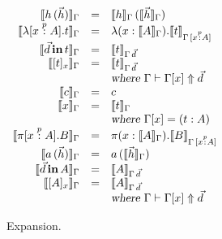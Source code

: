\begin{figure}
\begin{center}
\begin{math}
\begin{array}{rclr}

\llbracket h\,(\vec{h}) \rrbracket_{\Gamma}
&=& 
\llbracket h \rrbracket_{\Gamma}\,(\llbracket \vec{h} \rrbracket_{\Gamma}) 
\\
\llbracket \lambda [x \stackrel{p}{:} A]. t \rrbracket_{\Gamma}
&=&
\lambda (x : \llbracket A \rrbracket_{\Gamma}). \llbracket t \rrbracket_{\Gamma \, [x \stackrel{p}{:} A]}
\\
\llbracket \vec{d} \,\textbf{in}\, t \rrbracket_{\Gamma}
&=&
\llbracket t \rrbracket_{\Gamma \, \vec{d}}
\\
\llbracket [ t ]_{x} \rrbracket_{\Gamma}
&=&
\llbracket t \rrbracket_{\Gamma \, \vec{d}} \\
&&\textsl{where } \Gamma \vdash \Gamma[x] \Uparrow \vec{d}
\\
\llbracket c \rrbracket_{\Gamma} 
&=&
c
\\
\llbracket x \rrbracket_{\Gamma} 
&=&
\llbracket t \rrbracket_{\Gamma} \\
&& \textsl{where } \Gamma[x] = (t : A)
\\
\llbracket \pi [x \stackrel{p}{:} A]. B \rrbracket_{\Gamma}
&=&
\pi (x : \llbracket A \rrbracket_{\Gamma}). \llbracket B \rrbracket_{\Gamma \, [x \stackrel{p}{:} A]}
\\
\llbracket a\,(\vec{h}) \rrbracket_{\Gamma}
&=&
a\,(\llbracket \vec{h} \rrbracket_{\Gamma}) 
\\
\llbracket \vec{d} \,\textbf{in}\, A \rrbracket_{\Gamma}
&=&
\llbracket A \rrbracket_{\Gamma \, \vec{d}}
\\
\llbracket [ A ]_{x} \rrbracket_{\Gamma}
&=&
\llbracket A \rrbracket_{\Gamma \, \vec{d}}\\
&&\textsl{where } \Gamma \vdash \Gamma[x] \Uparrow \vec{d}
\\
\end{array}
\end{math}
\end{center}
\caption{Expansion.}
\label{fig:expansion}
\end{figure}
